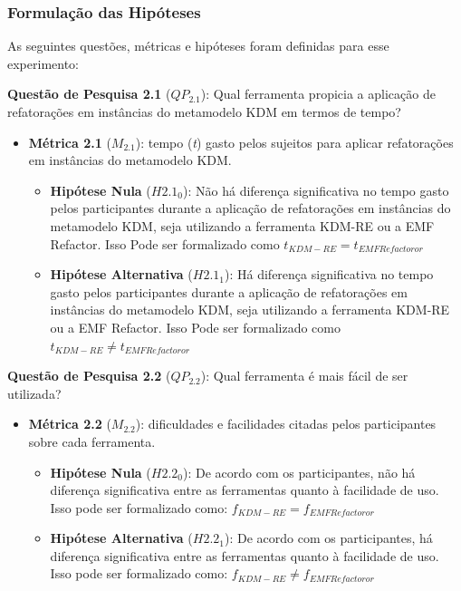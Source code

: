 \subsubsection{Formulação das Hipóteses}

As seguintes questões, métricas e hipóteses foram definidas para esse experimento:

\textbf{Questão de Pesquisa 2.1} (\textbf{$QP_{2.1}$}): Qual ferramenta propicia a aplicação de refatorações em instâncias do metamodelo KDM em termos de tempo?

\begin{itemize}
\item \textbf{Métrica 2.1} (\textbf{$M_{2.1}$}): tempo (\textit{t}) gasto pelos sujeitos para aplicar refatorações em instâncias do metamodelo KDM.
\begin{itemize}
\item \textbf{Hipótese Nula} (\textbf{$H2.1_0$}): Não há diferença significativa no tempo gasto pelos participantes durante a aplicação de refatorações em instâncias do metamodelo KDM, seja utilizando a ferramenta KDM-RE ou a EMF Refactor. Isso Pode ser formalizado como $t_{KDM-RE} = t_{EMF Refactoror}$
\item \textbf{Hipótese Alternativa} (\textbf{$H2.1_1$}): Há diferença significativa no tempo gasto pelos participantes durante a aplicação de refatorações em instâncias do metamodelo KDM, seja utilizando a ferramenta KDM-RE ou a EMF Refactor. Isso Pode ser formalizado como $t_{KDM-RE} \neq t_{EMF Refactoror}$
\end{itemize}
\end{itemize}

\textbf{Questão de Pesquisa 2.2} (\textbf{$QP_{2.2}$}): Qual ferramenta é mais fácil de ser utilizada?

\begin{itemize}
\item \textbf{Métrica 2.2} (\textbf{$M_{2.2}$}): dificuldades e facilidades citadas pelos participantes sobre cada ferramenta.
\begin{itemize}
\item \textbf{Hipótese Nula} (\textbf{$H2.2_0$}): De acordo com os participantes, não há diferença significativa entre as ferramentas quanto à facilidade de uso. Isso pode ser formalizado como: $f_{KDM-RE} = f_{EMF Refactoror}$ 

\item \textbf{Hipótese Alternativa} (\textbf{$H2.2_1$}): De acordo com os participantes, há diferença significativa entre as ferramentas quanto à facilidade de uso. Isso pode ser formalizado como: $f_{KDM-RE} \neq f_{EMF Refactoror}$
\end{itemize}
\end{itemize}

